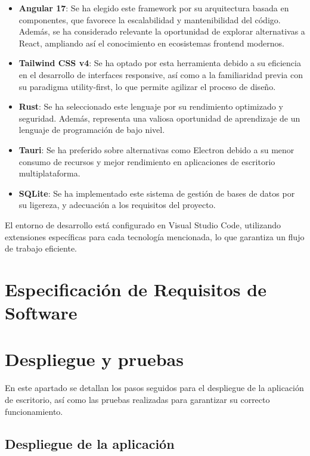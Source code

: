 \documentclass[11pt, a4paper]{article}
\begin{document}
        \begin{itemize}
            \item \textbf{Angular 17}: Se ha elegido este framework por su arquitectura basada en componentes, que favorece la escalabilidad y mantenibilidad del código. Además, se ha considerado relevante la oportunidad de explorar alternativas a React, ampliando así el conocimiento en ecosistemas frontend modernos.
            \item \textbf{Tailwind CSS v4}: Se ha optado por esta herramienta debido a su eficiencia en el desarrollo de interfaces responsive, así como a la familiaridad previa con su paradigma utility-first, lo que permite agilizar el proceso de diseño.
            \item \textbf{Rust}: Se ha seleccionado este lenguaje por su rendimiento optimizado y seguridad. Además, representa una valiosa oportunidad de aprendizaje de un lenguaje de programación de bajo nivel.
            \item \textbf{Tauri}: Se ha preferido sobre alternativas como Electron debido a su menor consumo de recursos y mejor rendimiento en aplicaciones de escritorio multiplataforma.
            \item \textbf{SQLite}: Se ha implementado este sistema de gestión de bases de datos por su ligereza, y adecuación a los requisitos del proyecto.
        \end{itemize}

    El entorno de desarrollo está configurado en Visual Studio Code, utilizando extensiones específicas para cada tecnología mencionada, lo que garantiza un flujo de trabajo eficiente.

\section{Especificación de Requisitos de Software}



\section{Despliegue y pruebas}

En este apartado se detallan los pasos seguidos para el despliegue de la aplicación de escritorio, así como las pruebas realizadas para garantizar su correcto funcionamiento.

        \subsection{Despliegue de la aplicación}
\end{document}

